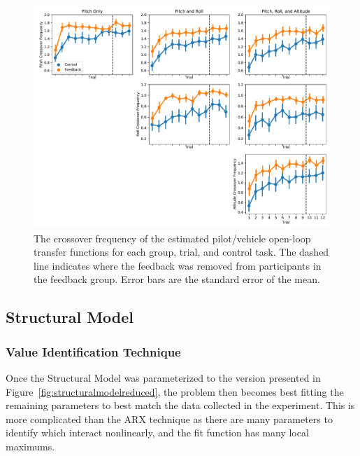 \begin{figure}[tb]
    \begin{center}
        \includegraphics[width=\linewidth]{figures/Modeling/crossover_measures.pdf}
        \caption[The crossover frequency of the estimated pilot/vehicle open-loop transfer functions for each group, trial, and control task]{The crossover frequency of the estimated pilot/vehicle open-loop transfer functions for each group, trial, and control task.
                The dashed line indicates where the feedback was removed from participants in the feedback group.
                Error bars are the standard error of the mean.}
        \label{figure:arxcomplete}
    \end{center}
\end{figure}

\subsection{Structural Model}
\subsubsection{Value Identification Technique}
Once the Structural Model was parameterized to the version presented in Figure~\ref{fig:structuralmodelreduced}, the problem then becomes best fitting the remaining parameters to best match the data collected in the experiment.
This is more complicated than the ARX technique as there are many parameters to identify which interact nonlinearly, and the fit function has many local maximums.

